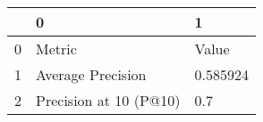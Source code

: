 \begin{tabular}{lll}
\toprule
{} &                       0 &         1 \\
\midrule
0 &                  Metric &     Value \\
1 &       Average Precision &  0.585924 \\
2 &  Precision at 10 (P@10) &       0.7 \\
\bottomrule
\end{tabular}
